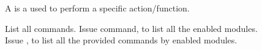 \label{ch:command}

A  is a  used to perform a specific action/function.\\

\begin{tips}{List all commands.}
    Issue  command, to list all the enabled modules.\\
    Issue , to list all the provided commands by enabled modules.
\end{tips}

